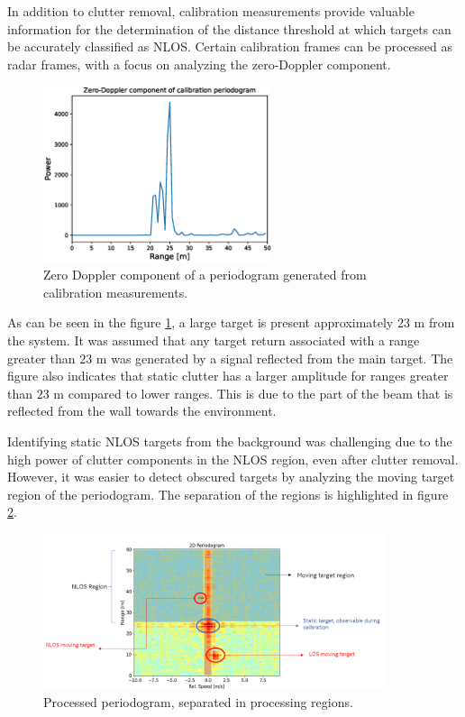In addition to clutter removal, calibration measurements provide valuable information for the determination of the distance threshold at which targets can be accurately classified as NLOS. Certain calibration frames can be processed as radar frames, with a focus on analyzing the zero-Doppler component.
	

\begin{figure}[H]
	\centering
	\includegraphics[width=0.6\textwidth]{Images/Test1/cali_static_per_t1.eps}
	\caption{Zero Doppler component of a periodogram generated from calibration measurements.}
	\label{fig:Test1_cali_static_per}
\end{figure}

As can be seen in the figure \ref{fig:Test1_cali_static_per}, a large target is present approximately $23$ m from the system. It was assumed that any target return associated with a range greater than $23$ m was generated by a signal reflected from the main target. The figure also indicates that static clutter has a larger amplitude for ranges greater than $23$ m compared to lower ranges. This is due to the part of the beam that is reflected from the wall towards the environment.

Identifying static NLOS targets from the background was challenging due to the high power of clutter components in the NLOS region, even after clutter removal. However, it was easier to detect obscured targets by analyzing the moving target region of the periodogram. The separation of the regions is highlighted in figure \ref{fig:Test1_nlos_los_separation}.

\begin{figure}[H]
	\centering
	\includegraphics[width=0.9\textwidth]{Images/Test1/nlos-los-separation.png}
	\caption{Processed periodogram, separated in processing regions.}
	\label{fig:Test1_nlos_los_separation}
\end{figure}



